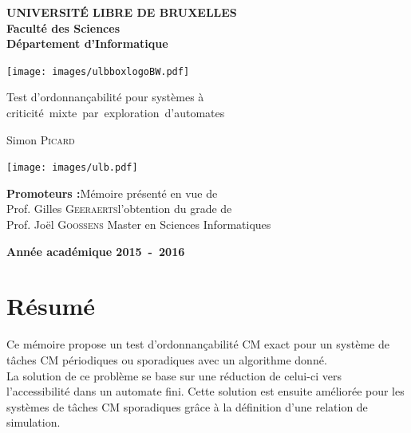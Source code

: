 \documentclass[12pt,a4paper,oneside]{book}
\theoremstyle{break}
\theoremstyle{breakplain}
\begin{document}

\begin{titlepage}
\noindent \begin{minipage}{0.83\textwidth}
\noindent \textbf{UNIVERSIT\'E LIBRE DE BRUXELLES}\hfill{}\\
\textbf{Faculté des Sciences}\hfill{}\\
\textbf{Département d'Informatique}\hfill{}
\end{minipage}
\begin{minipage}{0.17\textwidth}
\texttt{[image: images/ulbboxlogoBW.pdf]}
\end{minipage}
\begin{center}
\vfill{}\vfill{}\vfill{}
{\Huge Test d'ordonnançabilité pour systèmes à\\criticité~mixte~par~exploration~d'automates}
{\Huge \par}
\begin{center}{\LARGE Simon \textsc{Picard}}\end{center}{\Huge \par}
\vfill{}
\texttt{[image: images/ulb.pdf]}
\vfill{}
\begin{flushright}{\large \textbf{Promoteurs :}}\hfill{}{\large Mémoire présenté en vue de}\\
{\large Prof. Gilles \textsc{Geeraerts}}\hfill{}{\large l'obtention du grade de}\\{\large Prof. Joël \textsc{Goossens}}
\hfill{}{\large Master en Sciences Informatiques}\end{flushright}{\large\par}
\vfill{}\vfill{}\enlargethispage{2cm}
\textbf{Année académique 2015~-~2016}
\end{center}
\end{titlepage}



\newpage
\thispagestyle{empty} 
\null

\frontmatter


\chapter*{Résumé}
Ce mémoire propose un test d'ordonnançabilité CM exact pour un système de tâches CM périodiques ou sporadiques avec un algorithme donné.\\
La solution de ce problème se base sur une réduction de celui-ci vers l'accessibilité dans un automate fini. Cette solution est ensuite améliorée pour les systèmes de tâches CM sporadiques grâce à la définition d'une relation de simulation.\\
\end{document}
